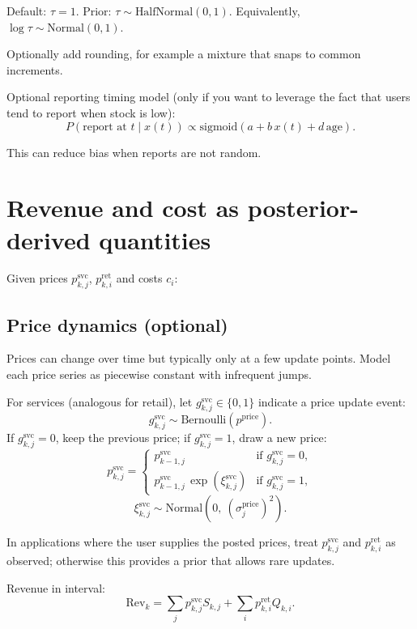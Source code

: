 \documentclass[11pt]{article}
\begin{document}
Default: $\tau=1$.
Prior: $\tau \sim \text{HalfNormal}(0,1)$.
Equivalently, $\log \tau \sim \text{Normal}(0,1)$.

Optionally add rounding, for example a mixture that snaps to common increments.

Optional reporting timing model (only if you want to leverage the fact that users tend to report when stock is low):
\[
  P(\text{report at } t \mid x(t)) \propto \text{sigmoid}(a + b\,x(t) + d\,\text{age}).
\]

This can reduce bias when reports are not random.

\section{Revenue and cost as posterior-derived quantities}\label{sec:revenue}

Given prices $p^{\mathrm{svc}}_{k,j}$, $p^{\mathrm{ret}}_{k,i}$ and costs $c_i$:

\subsection*{Price dynamics (optional)}

Prices can change over time but typically only at a few update points.
Model each price series as piecewise constant with infrequent jumps.

For services (analogous for retail), let $g^{\mathrm{svc}}_{k,j} \in \{0,1\}$ indicate a price update event:
\[
  g^{\mathrm{svc}}_{k,j} \sim \text{Bernoulli}(p^{\mathrm{price}}).
\]
If $g^{\mathrm{svc}}_{k,j}=0$, keep the previous price; if $g^{\mathrm{svc}}_{k,j}=1$, draw a new price:
\[
  p^{\mathrm{svc}}_{k,j} =
  \begin{cases}
    p^{\mathrm{svc}}_{k-1,j} & \text{if } g^{\mathrm{svc}}_{k,j}=0,\\
    p^{\mathrm{svc}}_{k-1,j}\,\exp(\xi^{\mathrm{svc}}_{k,j}) & \text{if } g^{\mathrm{svc}}_{k,j}=1,
  \end{cases}
\]
\[
  \xi^{\mathrm{svc}}_{k,j} \sim \text{Normal}(0,\ (\sigma^{\mathrm{price}}_{j})^2).
\]

In applications where the user supplies the posted prices, treat $p^{\mathrm{svc}}_{k,j}$ and $p^{\mathrm{ret}}_{k,i}$ as observed; otherwise this provides a prior that allows rare updates.

Revenue in interval:
\[
  \text{Rev}_k = \sum_j p^{\mathrm{svc}}_{k,j} S_{k,j} + \sum_i p^{\mathrm{ret}}_{k,i} Q_{k,i}.
\]
\end{document}

